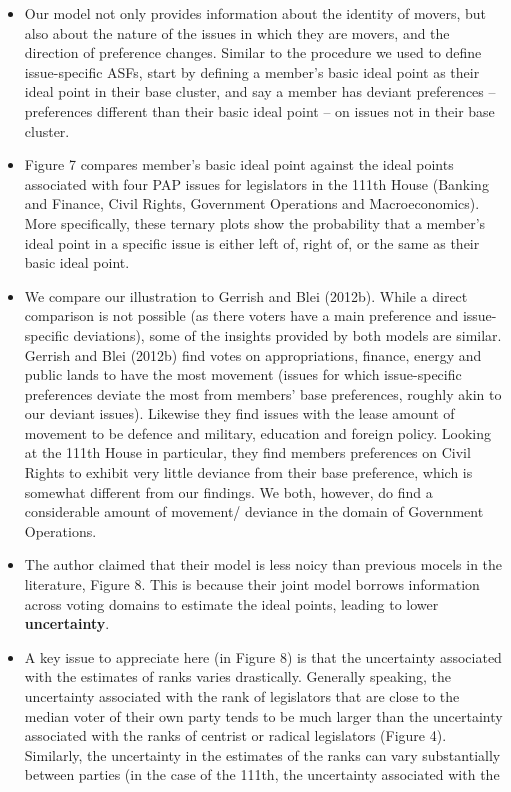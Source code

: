 \documentclass[a4paper,12pt]{article}
\begin{document}
\begin{enumerate}
\begin{itemize}
\item Our model not only provides information about the identity of movers, but also about the nature of the issues in which they are movers, and the direction of preference changes. Similar to the procedure we used to define issue-specific ASFs, start by defining a member’s basic ideal point as their ideal point in their base cluster, and say a member has deviant preferences – preferences different than their basic ideal point – on issues not in their base cluster.
\item Figure 7 compares member’s basic ideal point against the ideal points associated with four PAP issues for legislators in the 111th House (Banking and Finance, Civil Rights, Government Operations and Macroeconomics). More specifically, these ternary
plots show the probability that a member’s ideal point in a specific issue is either left of, right of, or the same as their basic ideal point.
\item We compare our illustration to Gerrish and Blei (2012b). While a direct comparison is not possible (as there voters have a main preference and issue-specific deviations), some of the insights provided by both models are similar. Gerrish and Blei (2012b) find votes on appropriations, finance, energy and public lands to have the most movement (issues for which issue-specific preferences deviate the most from members’ base preferences, roughly akin to our deviant issues). Likewise they find issues with the lease amount of movement to be defence and military, education and foreign policy. Looking at the 111th House in particular, they find members preferences on Civil Rights to exhibit very little deviance from their base preference, which is somewhat different from our findings. We both, however, do find a considerable amount of movement/ deviance in the domain of Government Operations.
\item The author claimed that their model is less noicy than previous mocels in the literature, Figure 8. This is because their joint model borrows information across voting domains to estimate the ideal points, leading to lower \textbf{uncertainty}.
\item A key issue to appreciate here (in Figure 8) is that the uncertainty associated with the estimates of ranks varies drastically. Generally speaking, the uncertainty associated with the rank of legislators that are close to the median voter of their own party tends to be much larger than the uncertainty associated with the ranks of centrist or radical legislators (Figure 4). Similarly, the uncertainty in the estimates of the ranks can vary substantially between parties (in the case of the 111th, the uncertainty associated with the

\end{itemize}
\end{enumerate}
\end{document}
